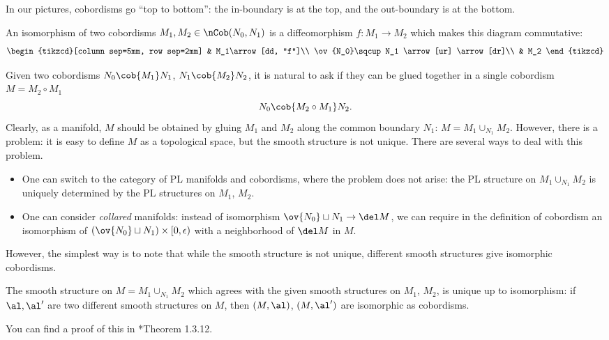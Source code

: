 \begin{convention}
In our pictures, cobordisms go ``top to bottom'':
the in-boundary is at the top, and the out-boundary is at the bottom.
\end{convention}

\begin{definition}\label{d:cobordism-isomorphism}
  An isomorphism of two cobordisms $M_1, M_2\in \nCob(N_0,N_1)$ is a
  diffeomorphism $f\colon M_1\to M_2$ which makes this diagram commutative:
  \begin{equation}\label{e:cob-iso}
  \begin{tikzcd}[column sep=5mm, row sep=2mm]
    & M_1\arrow[dd, "f"]\\
    \ov{N_0}\sqcup N_1
    \arrow[ur]
    \arrow[dr]\\
    & M_2
  \end{tikzcd}
  \end{equation}
\end{definition}
Given two cobordisms $N_0\cob{M_1}N_1$, $N_1\cob{M_2}N_2$, it is natural to
ask if they can be glued together in a single cobordism $M=M_2\circ M_1$
$$
  N_0\cob{M_2\circ M_1}N_2.
$$
Clearly, as a manifold, $M$ should be obtained by gluing $M_1$ and $M_2$ along
the common boundary $N_1$: $M= M_1\cup_{N_1} M_2$. However, there is a problem:
it is easy to define $M$ as a topological space, but the smooth structure is not
unique. There are several ways to deal with this problem.
\begin{itemize}
  \item One can switch to the category of PL manifolds and cobordisms,
    where the problem does not arise: the PL structure on $M_1\cup_{N_1} M_2$
    is uniquely determined by the PL structures on $M_1$, $M_2$.
  \item One can consider \emph{collared}
    manifolds: instead of
    isomorphism $\ov{N_0}\sqcup N_1\to \del M$,
    we can require in the definition of cobordism an isomorphism of
    $(\ov{N_0}\sqcup N_1)\times [0, \epsilon)$ with a neighborhood
    of $\del M$ in $M$.
\end{itemize}
However, the simplest way is to note that while the smooth structure is not
unique, different smooth structures give isomorphic cobordisms.

\begin{theorem}\label{t:gluing-unique}
  The smooth structure on $M=M_1\cup_{N_1} M_2$ which agrees with
  the given smooth structures on $M_1$, $M_2$, is unique up to isomorphism:
  if $\al, \al'$ are two different smooth structures on $M$, then $(M,\al)$,
  $(M,\al')$ are isomorphic as cobordisms.
\end{theorem}
You can find a proof of this in *{Theorem 1.3.12}.

